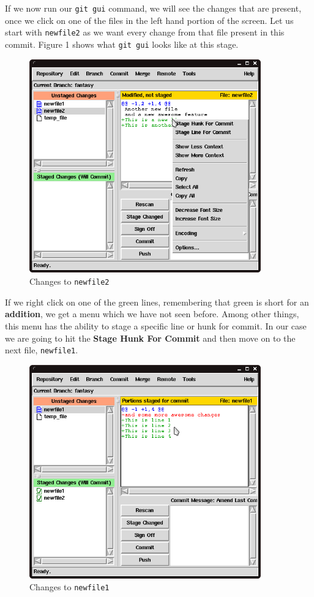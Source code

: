 If we now run our \texttt{git gui} command, we will see the changes that are present, once we click on one of the files in the left hand portion of the screen.  Let us start with \texttt{newfile2} as we want every change from that file present in this commit.  Figure 1 shows what \texttt{git gui} looks like at this stage.

\begin{figure}[hbt]
\centering
\includegraphics[width=10cm]{images/f-af5-d1.png}
\caption{Changes to \texttt{newfile2}}
\end{figure} 

If we right click on one of the green lines, remembering that green is short for an \textbf{addition}, we get a menu which we have not seen before.  Among other things, this menu has the ability to stage a specific line or hunk for commit.  In our case we are going to hit the \textbf{Stage Hunk For Commit} and then move on to the next file, \texttt{newfile1}.

\begin{figure}[hbt]
\centering
\includegraphics[width=10cm]{images/f-af5-d2.png}
\caption{Changes to \texttt{newfile1}}
\end{figure} 

